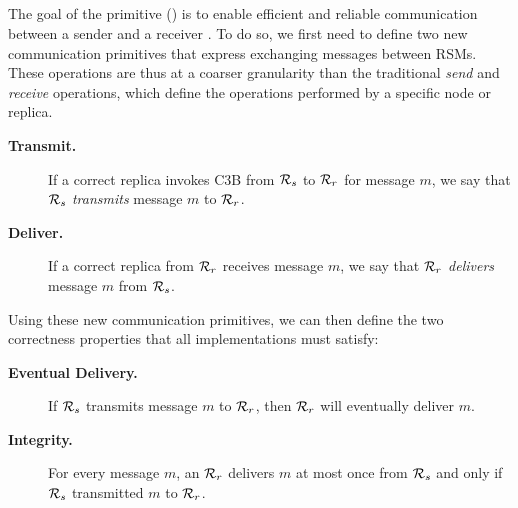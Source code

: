 \subsection{\CCCFull{}}
\label{ss:c3b}
The goal of the \CCCFull{} primitive (\CCC{}) is to enable efficient and reliable communication 
between a sender \RSM{} and a receiver \RSM{}. 
%
To do so, we first need to define two new communication primitives that express exchanging messages between RSMs. These operations are thus at a coarser granularity than the traditional \textit{send} and \textit{receive} operations, which define the operations performed by a specific node or replica.
\begin{description}
\item[\bf Transmit.]
If a correct replica invokes C3B from $\mathcal{R}_{s}$ to $\mathcal{R}_{r}$ for message $m$, 
we say that \RSM{} $\mathcal{R}_{s}$ {\em transmits} message $m$ to \RSM{} $\mathcal{R}_{r}$.
\item[\bf Deliver.]
If a correct replica from $\mathcal{R}_{r}$ receives message $m$, we say that \RSM{} $\mathcal{R}_{r}$ {\em delivers} message $m$ from $\mathcal{R}_{s}$.
\end{description}

Using these new communication primitives, we can then define the two correctness properties that all \CCC{} implementations must satisfy:
\begin{description}
\item[\bf Eventual Delivery.]
If \RSM{} $\mathcal{R}_{s}$ transmits message $m$ to \RSM{} $\mathcal{R}_{r}$, then $\mathcal{R}_{r}$ will eventually deliver $m$.
\item[\bf Integrity.]
For every message $m$, an \RSM{} $\mathcal{R}_{r}$ delivers $m$ at most once from $\mathcal{R}_{s}$ and only if $\mathcal{R}_{s}$
transmitted $m$ to $\mathcal{R}_{r}$.
\end{description}

